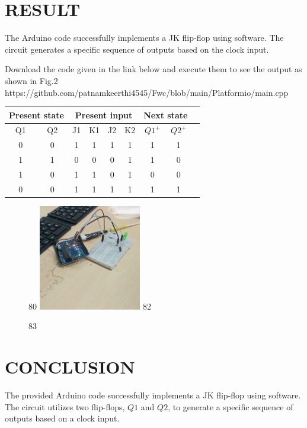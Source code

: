 \documentclass[conference]{IEEEtran}
\begin{document}
 \section{RESULT}
 The Arduino code successfully implements a JK flip-flop using software. The circuit generates a specific sequence of outputs based on the clock input.


 Download the code given in the link below and execute them to see the output as shown in Fig.2  \\
https://github.com/patnamkeerthi4545/Fwc/blob/main/Platformio/main.cpp


\begin{table}[ht]
\centering
\label{tab:connections}
\begin{tabular}{|c|c|c|c|c|c|c|c|c|}
\hline
\multicolumn{2}{|c|}{Present state} & \multicolumn{4}{c|}{Present input} & \multicolumn{2}{c|}{Next state} \\ \hline
	Q1 & Q2 & J1 & K1 & J2 & K2 & $Q1^{+}$ & $Q2^{+}$ \\ \hline
	0 & 0 & 1 & 1 & 1 & 1  & 1 & 1 \\ \hline
	1 & 1 & 0 & 0 & 0 & 1 &  1 & 0 \\ \hline
	1 & 0 & 1 & 1 & 0 & 1 & 0 & 0 \\ \hline
	0 & 0 & 1 & 1 & 1 & 1 & 1 & 1 \\ \hline
\end{tabular}
\end{table}

 \begin{figure}[h]
 80    \includegraphics[width=0.4\textwidth]{fig.jpg}
 82  \caption{\label{fig:1}}
 83 \end{figure}

 \section{CONCLUSION}

The provided Arduino code successfully implements a JK flip-flop using software. The circuit utilizes two flip-flops, $Q1$ and $Q2$, to generate a specific sequence of outputs based on a clock input. 
\end{document}
